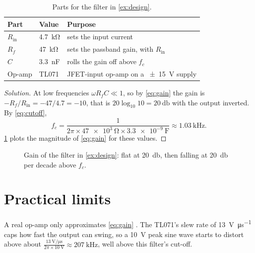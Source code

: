 \documentclass[11pt,a4paper]{article}   %
\numberwithin{equation}{section}
\numberwithin{figure}{section}
\numberwithin{table}{section}
\theoremstyle{definition}               %
\newenvironment{solution}{\begin{proof}[Solution]}{\end{proof}}
\begin{document}
\begin{table}[ht]
  \centering
  \caption{Parts for the filter in \cref{ex:design}.}
  \label{tab:parts}
  \begin{tabularx}{0.8\textwidth}{l l X}
    \toprule
    Part & Value & Purpose \\
    \midrule
    $R_\mathrm{in}$ & \qty{4.7}{\kilo\ohm} & sets the input current \\
    $R_f$ & \qty{47}{\kilo\ohm} & sets the passband gain, with $R_\mathrm{in}$ \\
    $C$ & \qty{3.3}{\nano\farad} & rolls the gain off above $f_c$ \\
    Op-amp & TL071 & JFET-input op-amp on a \qty{\pm 15}{\volt} supply \\
    \bottomrule
  \end{tabularx}
\end{table}

\begin{solution}
At low frequencies $\omega R_f C \ll 1$, so by \cref{eq:gain} the gain is
$-R_f / R_\mathrm{in} = -47 / 4.7 = -10$, that is $20 \log_{10} 10 = \qty{20}{\decibel}$ with the
output inverted. By \cref{eq:cutoff},
\[
  f_c = \frac{1}{2\pi \times \qty{47e3}{\ohm} \times \qty{3.3e-9}{\farad}}
      \approx \qty{1.03}{\kilo\hertz}.
\]
\cref{fig:bode} plots the magnitude of \cref{eq:gain} for these values.
\end{solution}

\begin{figure}[ht]
  \centering
  \caption{Gain of the filter in \cref{ex:design}: flat at \qty{20}{\decibel}, then
    falling at \qty{20}{\decibel} per decade above $f_c$.}
  \label{fig:bode}
\end{figure}

\section{Practical limits}

A real op-amp only approximates \cref{eq:gain} \parencite{Horowitz2015}. The TL071's slew rate of
\qty{13}{\volt\per\micro\second} caps how fast the output can swing, so a \qty{10}{\volt} peak
sine wave starts to distort above about
$\frac{\qty{13}{\volt\per\micro\second}}{2\pi \times \qty{10}{\volt}} \approx \qty{207}{\kilo\hertz}$,
well above this filter's cut-off.

\printbibliography
\end{document}
